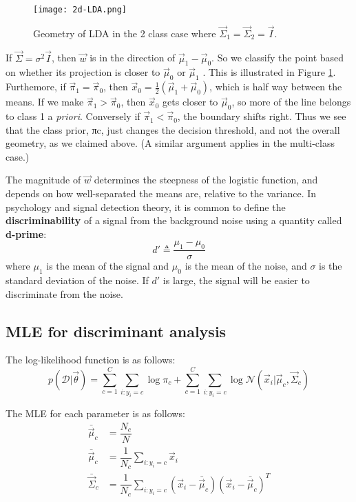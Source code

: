 \begin{figure}[hbtp]
\centering
    \texttt{[image: 2d-LDA.png]}
\caption{Geometry of LDA in the 2 class case where $\vec{\Sigma}_1=\vec{\Sigma}_2=\vec{I}$.}
\label{fig:2d-LDA} 
\end{figure}

If $\vec{\Sigma}=\sigma^2\vec{I}$, then $\vec{w}$ is in the direction of $\vec{\mu}_1-\vec{\mu}_0$. So we classify the point based on whether its projection is closer to $\vec{\mu}_0$ or $\vec{\mu}_1$ . This is illustrated in Figure \ref{fig:2d-LDA}. Furthemore, if $\vec{\pi}_1=\vec{\pi}_0$, then $\vec{x}_0=\frac{1}{2}(\vec{\mu}_1+\vec{\mu}_0)$, which is half way between the means. If we make $\vec{\pi}_1>\vec{\pi}_0$, then $\vec{x}_0$ gets closer to $\vec{\mu}_0$, so more of the line belongs to class 1 a \emph{priori}. Conversely if $\vec{\pi}_1<\vec{\pi}_0$, the boundary shifts right. Thus we see that the class prior, πc, just changes the decision threshold, and not the overall geometry, as we claimed above. (A similar argument applies in the multi-class case.)

The magnitude of $\vec{w}$ determines the steepness of the logistic function, and depends on how well-separated the means are, relative to the variance. In psychology and signal detection theory, it is common to define the \textbf{discriminability} of a signal from the background noise using a quantity called \textbf{d-prime}:
\begin{equation}
d' \triangleq \dfrac{\mu_1-\mu_0}{\sigma}
\end{equation}
where $\mu_1$ is the mean of the signal and $\mu_0$ is the mean of the noise, and $\sigma$ is the standard deviation of the noise. If $d'$ is large, the signal will be easier to discriminate from the noise.


\subsection{MLE for discriminant analysis}
\label{sec:MLE-for-discriminant-analysis}
The log-likelihood function is as follows:
\begin{equation}
p(\mathcal{D}|\vec{\theta})=\sum\limits_{c=1}^C{\sum\limits_{i:y_i=c}{\log\pi_c}}+\sum\limits_{c=1}^C{\sum\limits_{i:y_i=c}{\log\mathcal{N}(\vec{x}_i|\vec{\mu}_c,\vec{\Sigma}_c)}}
\end{equation}

The MLE for each parameter is as follows:
\begin{align}
\bar{\vec{\mu}}_c& = \dfrac{N_c}{N} \\
\bar{\vec{\mu}}_c& = \dfrac{1}{N_c}\sum\limits_{i:y_i=c}\vec{x}_i \\
\bar{\vec{\Sigma}}_c& = \dfrac{1}{N_c}\sum\limits_{i:y_i=c}(\vec{x}_i-\bar{\vec{\mu}}_c)(\vec{x}_i-\bar{\vec{\mu}}_c)^T
\end{align}


